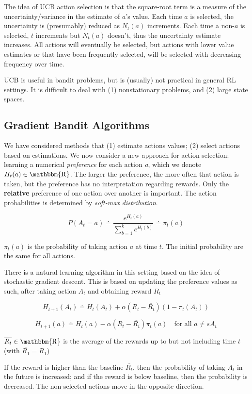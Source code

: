 \documentclass[lang=en,mode=geye,device=normal,color=blue,14pt]{elegantnote}
\DeclareMathOperator*{\1}{\mathbbm{1}}
\DeclareMathOperator*{\R}{\mathbbm{R}}
\begin{document}
The idea of UCB action selection is that the square-root term is a measure of the uncertainty/variance in the estimate of $a$'s value.
Each time $a$ is selected, the uncertainty is (presumably) reduced as $N_t(a)$ increments.
Each time a non-$a$ is selected, $t$ increments but $N_t(a)$ doesn't, thus the uncertainty estimate increases.
All actions will eventually be selected, but actions with lower value estimates or that have been frequently selected, will be selected with decreasing frequency over time.

UCB is useful in bandit problems, but is (usually) not practical in general RL settings. It is difficult to deal with (1) nonstationary problems, and (2) large state spaces.

\subsection{Gradient Bandit Algorithms}
We have considered methods that (1) estimate actions values; (2) select actions based on estimations.
We now consider a new approach for action selection: learning a numerical \textit{preference} for each action \textit{a}, which we denote $H_t(a) \in \R$.
The larger the preference, the more often that action is taken, but the preference has no interpretation regarding rewards.
Only the \textbf{relative} preference of one action over another is important.
The action probabilities is determined by \textit{soft-max distribution}.

\[
P(A_t=a) \doteq \frac{e^{H_t(a)}}{\sum_{b=1}^k e^{H_t(b)}} \doteq \pi_t(a)
\]

$\pi_t(a)$ is the probability of taking action $a$ at time $t$. The initial probability are the same for all actions.

There is a natural learning algorithm in this setting based on the idea of stochastic gradient descent.
This is based on updating the preference values as such, after taking action $A_t$ and obtaining reward $R_t$

$$ H_{t+1}(A_t)\doteq H_t(A_t) + \alpha (R_t - \overline{R_t})(1-\pi_t(A_t)) $$

$$ H_{t+1}(a) \doteq H_t(a) - \alpha(R_t - \overline{R_t})\pi_t(a)\quad\text{for all }a\neq sA_t $$

$\overline{R_t} \in \R $ is the average of the rewards up to but not including time $t$ (with $\overline{R_1} = R_1$)

If the reward is higher than the baseline $\overline{R_t}$, then the probability of taking $A_t$ in the future is increased; and if the reward is below baseline, then the probability is decreased.
The non-selected actions move in the opposite direction.
\end{document}
